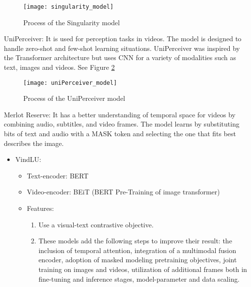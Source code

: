 \begin{figure}[h]
    \centering
    \texttt{[image: singularity\_model]}
    \caption{Process of the Singularity model}
    \label{fig:singularity_m}
\end{figure}

UniPerceiver: It is used for perception tasks in videos. The model is designed to handle zero-shot and few-shot learning situations. UniPerceiver was inspired by the Transformer architecture but uses CNN for a variety of modalities such as text, images and videos. See Figure \ref{fig:uniPerceiver_m}

\begin{figure}[h]
    \centering
    \texttt{[image: uniPerceiver\_model]}
    \caption{Process of the UniPerceiver model}
    \label{fig:uniPerceiver_m}
\end{figure}

Merlot Reserve: It has a better understanding of temporal space for videos by combining audio, subtitles, and video frames. The model learns by substituting bits of text and audio with a MASK token and selecting the one that fits best describes the image. 

\begin{itemize}
\item VindLU:
\begin{itemize}
\item Text-encoder: BERT
\item Video-encoder: BEiT (BERT Pre-Training of image transformer)
\item Features:
\begin{enumerate}
\item Use a visual-text contrastive objective.
\item These models add the following steps to improve their result: the inclusion of temporal attention, integration of a multimodal fusion encoder, adoption of masked modeling pretraining objectives, joint training on images and videos, utilization of additional frames both in fine-tuning and inference stages, model-parameter and data scaling.
\end{enumerate}
\end{itemize}
\end{itemize}